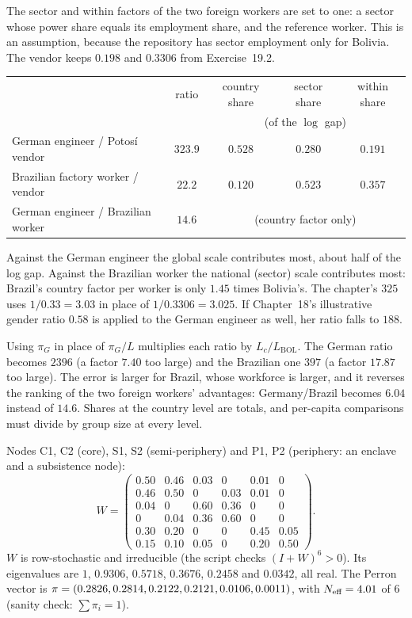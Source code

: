 \documentclass[../solutions_manual.tex]{subfiles}
\begin{document}
 The sector and within factors of the two foreign workers are set to one: a sector whose power share equals its employment share, and the reference worker. This is an assumption, because the repository has sector employment only for Bolivia. The vendor keeps $0.198$ and $0.3306$ from Exercise~19.2.
\begin{center}\small
\begin{tabular}{lcccc}
\toprule
& ratio & country share & sector share & within share \\
& & \multicolumn{3}{c}{(of the $\log$ gap)} \\
\midrule
German engineer / Potos\'i vendor & $323.9$ & $0.528$ & $0.280$ & $0.191$ \\
Brazilian factory worker / vendor & $22.2$ & $0.120$ & $0.523$ & $0.357$ \\
German engineer / Brazilian worker & $14.6$ & \multicolumn{3}{c}{(country factor only)} \\
\bottomrule
\end{tabular}
\end{center}
Against the German engineer the global scale contributes most, about half of the log gap. Against the Brazilian worker the national (sector) scale contributes most: Brazil's country factor per worker is only $1.45$ times Bolivia's. The chapter's $325$ uses $1/0.33 = 3.03$ in place of $1/0.3306 = 3.025$. If Chapter~18's illustrative gender ratio $0.58$ is applied to the German engineer as well, her ratio falls to $188$.

 Using $\pi_G$ in place of $\pi_G/L$ multiplies each ratio by $L_c/L_{\text{BOL}}$. The German ratio becomes $2396$ (a factor $7.40$ too large) and the Brazilian one $397$ (a factor $17.87$ too large). The error is larger for Brazil, whose workforce is larger, and it reverses the ranking of the two foreign workers' advantages: Germany/Brazil becomes $6.04$ instead of $14.6$. Shares at the country level are totals, and per-capita comparisons must divide by group size at every level.


 Nodes C1, C2 (core), S1, S2 (semi-periphery) and P1, P2 (periphery: an enclave and a subsistence node):
\[
W = \begin{pmatrix}
0.50 & 0.46 & 0.03 & 0 & 0.01 & 0\\
0.46 & 0.50 & 0 & 0.03 & 0.01 & 0\\
0.04 & 0 & 0.60 & 0.36 & 0 & 0\\
0 & 0.04 & 0.36 & 0.60 & 0 & 0\\
0.30 & 0.20 & 0 & 0 & 0.45 & 0.05\\
0.15 & 0.10 & 0.05 & 0 & 0.20 & 0.50
\end{pmatrix}.
\]
$W$ is row-stochastic and irreducible (the script checks $(I+W)^6 > 0$). Its eigenvalues are $1$, $0.9306$, $0.5718$, $0.3676$, $0.2458$ and $0.0342$, all real. The Perron vector is $\pi = (0.2826, 0.2814, 0.2122, 0.2121, 0.0106, 0.0011)$, with $N_{\text{eff}} = 4.01$ of 6 (sanity check: $\sum\pi_i = 1$).
\end{document}
